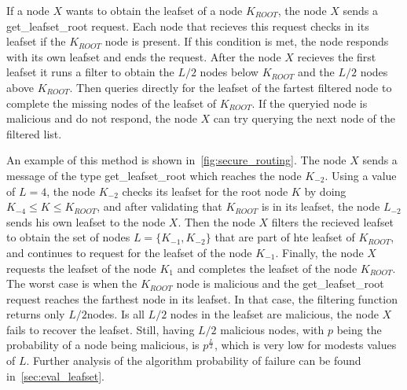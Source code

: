 If a node $X$ wants to obtain the leafset of a node $K_{ROOT}$, the node $X$ sends a get\_leafset\_root request.
Each node that recieves this request checks in its leafset if the $K_{ROOT}$
node is present. If this condition is met, the node responds with its own
leafset and ends the request.
After the node $X$ recieves the first leafset it runs a filter to obtain the
$L/2$ nodes  below $K_{ROOT}$ and the $L/2$ nodes above $K_{ROOT}$. Then
queries directly for the leafset of the fartest filtered node to complete
the missing nodes of the leafset of $K_{ROOT}$.  If the queryied node is
malicious and do not respond,  the node $X$ can try querying the next node of
the filtered list.

An example of this method is shown in~\ref{fig:secure_routing}. The node $X$
sends a message of the type get\_leafset\_root which reaches the node $K_{-2}$.
Using a value of $L = 4$, the node $K_{-2}$ checks its leafset for the root
node $K$ by doing $K_{-4} \le K \le K_{ROOT}$, and after validating that $K_{ROOT}$
is in its leafset, the node $L_{-2}$ sends his own leafset to the node $X$.
Then the node $X$ filters the recieved leafset to obtain the set of nodes 
$L = \{K_{-1}, K_{-2}\}$ that are part of hte leafset of $K_{ROOT}$,  and
continues to request for the leafset of the node $K_{-1}$. Finally, the node $X$
requests the leafset of the node $K_{1}$ and completes the leafset of the node
$K_{ROOT}$. The worst case is when the $K_{ROOT}$ node is malicious and the
get\_leafset\_root request reaches the farthest node in its leafset. In that
case, the filtering function returns only $L/2$nodes. Is all $L/2$ nodes in the
leafset are malicious, the node $X$ fails to recover the leafset. Still, having $L/2$
malicious nodes, with $p$ being the probability of a node being malicious, is
$p^{\frac{L}{2}}$, which is very low for modests values of $L$. Further
analysis of the algorithm probability of failure can be found in~\ref{sec:eval_leafset}.


